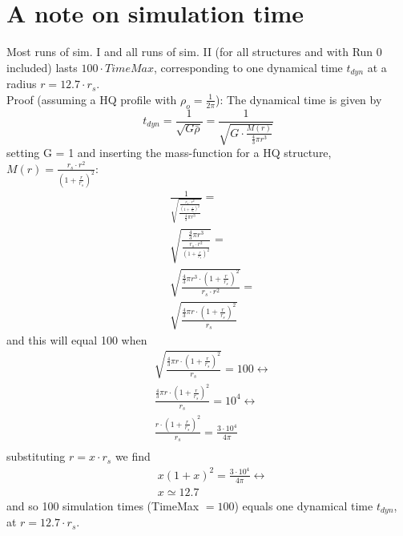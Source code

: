 \section{A note on simulation time}
Most runs of sim. I and all runs of sim. II (for all structures and with Run 0 included) lasts $100\cdot TimeMax$, corresponding to one dynamical time $t_{dyn}$ at a radius $r=12.7 \cdot r_s$. \\
Proof (assuming a HQ profile with $\rho_o = \frac{1}{2\pi}$):
The dynamical time is given by
\begin{equation}
t_{dyn} = \frac{1}{\sqrt{G \bar{\rho}}} = \frac{1}{\sqrt{G \cdot \frac{M(r)}{\frac{4}{3}\pi r^3}}} 
\end{equation}
setting G = 1 and inserting the mass-function for a HQ structure, $M(r)=\frac{r_s\cdot r^2}{(1+\frac{r}{r_s})^2}$:
\begin{align*}
& \frac{1}{\sqrt{\frac{ \frac{r_s\cdot r^2}{ (1+\frac{r}{r_s})^2 } }{\frac{4}{3}\pi r^3}}} = \\
& \sqrt{ \frac{\frac{4}{3}\pi r^3}{\frac{r_s\cdot r^2}{ (1+\frac{r}{r_s})^2 } }}     = \\
& \sqrt{ \frac{\frac{4}{3}\pi r^3 \cdot (1+\frac{r}{r_s})^2}{r_s\cdot r^2}}     = \\
& \sqrt{ \frac{\frac{4}{3}\pi r \cdot (1+\frac{r}{r_s})^2}{r_s}} 
\end{align*}
and this will equal 100 when 
\begin{align*}
& \sqrt{ \frac{\frac{4}{3}\pi r \cdot (1+\frac{r}{r_s})^2}{r_s}} = 100 \leftrightarrow \\
& \frac{\frac{4}{3}\pi r \cdot (1+\frac{r}{r_s})^2}{r_s} = 10^4 \leftrightarrow \\
& \frac{r \cdot (1+\frac{r}{r_s})^2}{r_s} = \frac{3\cdot 10^4}{4\pi}\\
\end{align*}
substituting $ r = x\cdot r_s$ we find
\begin{align*}
& x(1+x)^2 = \frac{3\cdot 10^4}{4\pi} \leftrightarrow \\
& x \simeq 12.7
\end{align*}
and so 100 simulation times (TimeMax $= 100$) equals one dynamical time $t_{dyn}$, at $ r = 12.7\cdot r_s$.